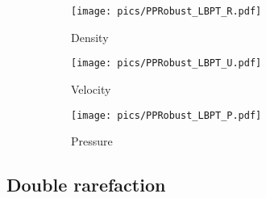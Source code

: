 \begin{figure}[htbp]
   \centering
   \begin{subfigure}{0.33\textwidth}
       \texttt{[image: pics/PPRobust\_LBPT\_R.pdf]}
       \caption[]{Density}
   \end{subfigure}\hfill
   \begin{subfigure}{0.33\textwidth}
       \texttt{[image: pics/PPRobust\_LBPT\_U.pdf]}
       \caption[]{Velocity}
   \end{subfigure}\hfill
   \begin{subfigure}{0.33\textwidth}
       \texttt{[image: pics/PPRobust\_LBPT\_P.pdf]}
       \caption[]{Pressure}
   \end{subfigure}
   \caption{}
   \label{fig:leBlancParamTest}
\end{figure}


\subsection{Double rarefaction}

